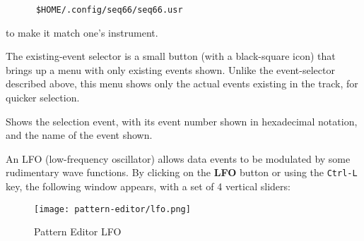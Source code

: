    \begin{verbatim}
      $HOME/.config/seq66/seq66.usr
   \end{verbatim}

   to make it match one's instrument.

   The existing-event selector is a small button (with a black-square icon)
   that brings up a menu with only existing events shown.
   Unlike the event-selector described above, this menu
   shows only the actual events existing in the track, for quicker selection.

   Shows the selection event, with its event number shown in hexadecimal
   notation, and the name of the event shown.

   An LFO (low-frequency oscillator) allows data events
   to be modulated by some rudimentary wave functions.
   By clicking on the \textbf{LFO} button or using the \texttt{Ctrl-L} key,
   the following window appears, with a set of 4 vertical sliders:

\begin{figure}[H]
   \centering 
  \texttt{[image: pattern-editor/lfo.png]}
   \caption{Pattern Editor LFO}
   \label{fig:pattern_editor_bottom_lfo}
\end{figure}

